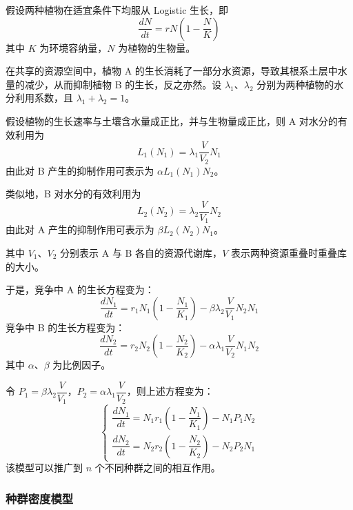 \documentclass[11pt,a4paper]{ctexart}
\begin{document}
假设两种植物在适宜条件下均服从 Logistic 生长，即
\begin{equation}
\frac{dN}{dt}=rN\left(1-\frac{N}{K}\right)
\end{equation}
其中 $K$ 为环境容纳量，$N$ 为植物的生物量。

在共享的资源空间中，植物 A 的生长消耗了一部分水资源，导致其根系土层中水量的减少，从而抑制植物 B 的生长，反之亦然。设 $\lambda_1$、$\lambda_2$ 分别为两种植物的水分利用系数，且 $\lambda_1+\lambda_2=1$。

假设植物的生长速率与土壤含水量成正比，并与生物量成正比，则 A 对水分的有效利用为
\begin{equation}
L_1(N_1)=\lambda_1\frac{V}{V_2}N_1
\end{equation}
由此对 B 产生的抑制作用可表示为 $\alpha L_1(N_1)N_2$。

类似地，B 对水分的有效利用为
\begin{equation}
L_2(N_2)=\lambda_2\frac{V}{V_1}N_2
\end{equation}
由此对 A 产生的抑制作用可表示为 $\beta L_2(N_2)N_1$。

其中 $V_1$、$V_2$ 分别表示 A 与 B 各自的资源代谢库，$V$ 表示两种资源重叠时重叠库的大小\cite{ref1}。

于是，竞争中 A 的生长方程变为：
\begin{equation}
\frac{dN_1}{dt}=r_1N_1\left(1-\frac{N_1}{K_1}\right)-\beta\lambda_2\frac{V}{V_1}N_2N_1
\end{equation}
竞争中 B 的生长方程变为：
\begin{equation}
\frac{dN_2}{dt}=r_2N_2\left(1-\frac{N_2}{K_2}\right)-\alpha\lambda_1\frac{V}{V_2}N_1N_2
\end{equation}
其中 $\alpha$、$\beta$ 为比例因子。

令 $P_1=\beta\lambda_2\dfrac{V}{V_1}$，$P_2=\alpha\lambda_1\dfrac{V}{V_2}$，则上述方程变为：
\begin{equation}
\begin{cases}
\dfrac{dN_1}{dt}=N_1r_1\left(1-\dfrac{N_1}{K_1}\right)-N_1P_1N_2\\[0.6em]
\dfrac{dN_2}{dt}=N_2r_2\left(1-\dfrac{N_2}{K_2}\right)-N_2P_2N_1
\end{cases}
\end{equation}
该模型可以推广到 $n$ 个不同种群之间的相互作用。

\subsubsection{种群密度模型}
\end{document}
